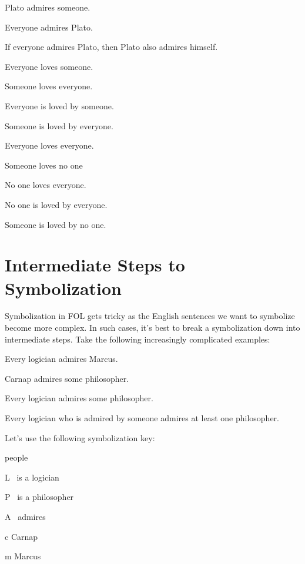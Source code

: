 \begin{earg}
\item Plato admires someone.
\item Everyone admires Plato.
\item If everyone admires Plato, then Plato also admires himself.
\item  Everyone loves someone.
\item Someone loves everyone.
\item Everyone is loved by someone.
\item  Someone is loved by everyone.
\item Everyone loves everyone.
\item Someone loves no one
\item No one loves everyone.
\item No one is  loved by everyone.
\item Someone is loved by no one.
\end{earg}


\section{Intermediate Steps to Symbolization}\label{s:FOLSymSteps}

Symbolization in FOL gets tricky as the English sentences we want to symbolize become more complex. In such cases, it's best to break a symbolization down into intermediate steps.  Take the following increasingly complicated examples:

\begin{earg}
\item[\ex{log1}] Every logician admires Marcus.
\item[\ex{log2}] Carnap admires some philosopher.
\item[\ex{log3}] Every logician admires some philosopher.
\item[\ex{log4}] Every logician who is admired by someone admires at least one philosopher.
\end{earg}

\noindent Let's use the following symbolization key:

\begin{ekey}
\item[\text{Domain}] people
\item[L] \blank\ is a logician
\item[P] \blank\ is a philosopher
\item[A] \blank\ admires \blank
\item[c] Carnap
\item[m] Marcus 
\end{ekey}

